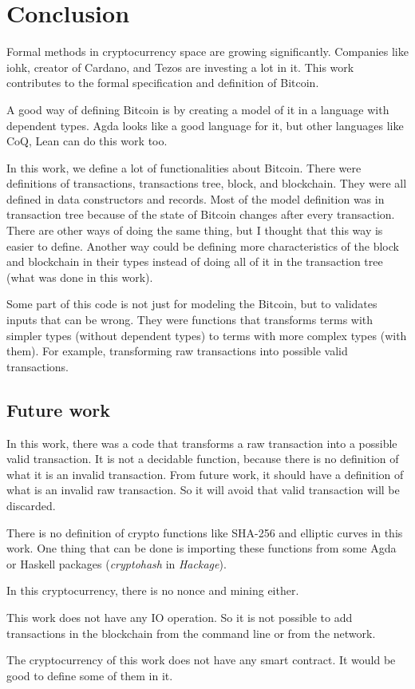 \section{Conclusion}

Formal methods in cryptocurrency space are growing significantly.
Companies like \gls{iohk}, creator of Cardano, and Tezos are investing a lot in it.
This work contributes to the formal specification and definition of Bitcoin.

A good way of defining Bitcoin is by creating a model of it in a language with dependent types.
Agda looks like a good language for it, but other languages like CoQ, Lean can do this work too.

In this work, we define a lot of functionalities about Bitcoin.
There were definitions of transactions, transactions tree, block, and blockchain.
They were all defined in data constructors and records.
Most of the model definition was in transaction tree
because of the state of Bitcoin changes after every transaction.
There are other ways of doing the same thing,
but I thought that this way is easier to define.
Another way could be defining more characteristics of the block and blockchain in their
types instead of doing all of it in the transaction tree (what was done in this work).

Some part of this code is not just for modeling the Bitcoin,
but to validates inputs that can be wrong.
They were functions that transforms terms with simpler types (without dependent types)
to terms with more complex types (with them).
For example, transforming raw transactions into possible valid transactions.

\subsection{Future work}

In this work, there was a code that transforms a raw transaction into a possible valid transaction.
It is not a decidable function, because there is no definition of what it is an invalid transaction.
From future work, it should have a definition of what is an invalid raw transaction.
So it will avoid that valid transaction will be discarded. 

There is no definition of crypto functions like SHA-256 and elliptic curves in this work.
One thing that can be done is importing these functions from some Agda or Haskell packages
(\emph{cryptohash} in \emph{Hackage}).

In this cryptocurrency, there is no nonce and mining either.

This work does not have any IO operation.
So it is not possible to add transactions in the blockchain from the command line or from the network.

The cryptocurrency of this work does not have any smart contract.
It would be good to define some of them in it.
